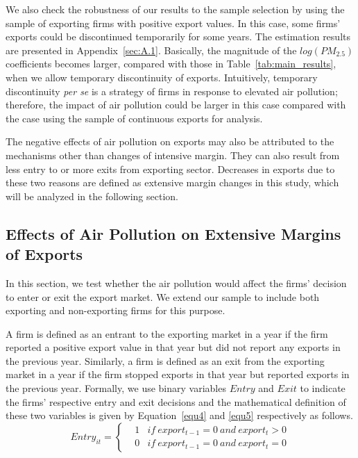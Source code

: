 \documentclass[12pt]{article}
\begin{document}
We also check the robustness of our results to the sample selection by using the sample of exporting firms with positive export values. In this case, some firms' exports could be discontinued temporarily for some years. The estimation results are presented in Appendix~\ref{sec:A.1}. Basically, the magnitude of the $log(PM_{2.5})$ coefficients becomes larger, compared with those in Table~\ref{tab:main_results}, when we allow temporary discontinuity of exports. Intuitively, temporary discontinuity \emph{per se} is a strategy of firms in response to elevated air pollution; therefore, the impact of air pollution could be larger in this case compared with the case using the sample of continuous exports for analysis.

The negative effects of air pollution on exports may also be attributed to the mechanisms other than changes of intensive margin. They can also result from less entry to or more exits from exporting sector. Decreases in exports due to these two reasons are defined as extensive margin changes in this study, which will be analyzed in the following section.
\subsection{Effects of Air Pollution on Extensive Margins of Exports} \label{sec:4.2}
 In this section, we test whether the air pollution would affect the
  firms' decision to enter or exit the export market. We extend our sample to include
  both exporting and non-exporting firms for this purpose. 
  
  A firm is defined as an entrant to the exporting market in a year if the firm reported a positive export value in that year but did not report any exports in the previous year. Similarly, a firm is defined as an exit from the exporting market in a year if the firm stopped exports in that year but reported exports in the previous year. Formally, we use binary variables $Entry$ and $Exit$ to indicate the firms' respective entry and exit decisions and the mathematical definition of these two variables is given by Equation~\ref{equ4} and \ref{equ5} respectively as follows. 
  \begin{equation}  \label{equ4}
  Entry_{it} = \left\{ \begin{aligned} & 1 & if \ export_{t-1} = 0 \ and \
  export_{t} > 0 \\ & 0 & if \ export_{t-1} = 0 \ and \ export_{t} = 0
  \end{aligned} \right.
  \end{equation}
  
\end{document}

